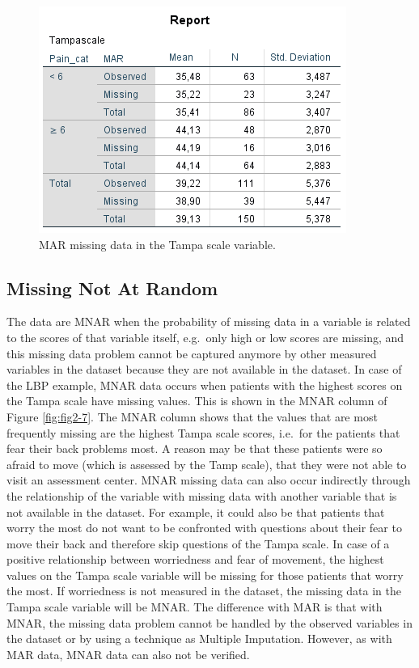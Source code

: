 \documentclass[]{book}
\theoremstyle{definition}
\theoremstyle{definition}
\theoremstyle{definition}
\theoremstyle{remark}
\begin{document}
\begin{figure}

{\centering \includegraphics[width=0.9\linewidth]{images/tab2.3} 

}

\caption{MAR missing data in the Tampa scale variable.}\label{fig:tab2-3}
\end{figure}

\subsection{Missing Not At Random}\label{missing-not-at-random}

The data are MNAR when the probability of missing data in a variable is
related to the scores of that variable itself, e.g.~only high or low
scores are missing, and this missing data problem cannot be captured
anymore by other measured variables in the dataset because they are not
available in the dataset. In case of the LBP example, MNAR data occurs
when patients with the highest scores on the Tampa scale have missing
values. This is shown in the MNAR column of Figure \ref{fig:fig2-7}. The
MNAR column shows that the values that are most frequently missing are
the highest Tampa scale scores, i.e.~for the patients that fear their
back problems most. A reason may be that these patients were so afraid
to move (which is assessed by the Tamp scale), that they were not able
to visit an assessment center. MNAR missing data can also occur
indirectly through the relationship of the variable with missing data
with another variable that is not available in the dataset. For example,
it could also be that patients that worry the most do not want to be
confronted with questions about their fear to move their back and
therefore skip questions of the Tampa scale. In case of a positive
relationship between worriedness and fear of movement, the highest
values on the Tampa scale variable will be missing for those patients
that worry the most. If worriedness is not measured in the dataset, the
missing data in the Tampa scale variable will be MNAR. The difference
with MAR is that with MNAR, the missing data problem cannot be handled
by the observed variables in the dataset or by using a technique as
Multiple Imputation. However, as with MAR data, MNAR data can also not
be verified.
\end{document}
